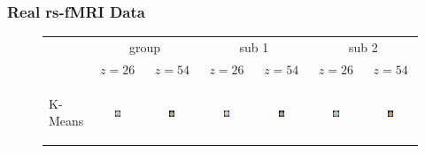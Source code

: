 \documentclass[serif]{beamer}
\begin{document}
\begin{frame}
\frametitle{Real rs-fMRI Data}

\begin{figure}[htb]
\centering
\begin{tabular}{lcc|cc|cc}
&
\multicolumn{2}{c|}{group} &
\multicolumn{2}{c|}{sub 1} &
\multicolumn{2}{c}{sub 2} \\
& $z = 26$ & $z=54$ & $z = 26$ & $z=54$ & $z = 26$ & $z=54$ \\
\begin{sideways} \footnotesize \textsf{K-Means} \end{sideways} &
\includegraphics[width=0.13\textwidth]{figure2/kmeans_grp_z25} &
\includegraphics[width=0.13\textwidth]{figure2/kmeans_grp_z32} &
\includegraphics[width=0.13\textwidth]{figure2/kmeans_sub1_z25} &
\includegraphics[width=0.13\textwidth]{figure2/kmeans_sub1_z32} &
\includegraphics[width=0.13\textwidth]{figure2/kmeans_sub2_z25} &
\includegraphics[width=0.13\textwidth]{figure2/kmeans_sub2_z32} \\

\end{tabular}
\end{figure}
\end{frame}
\end{document}
